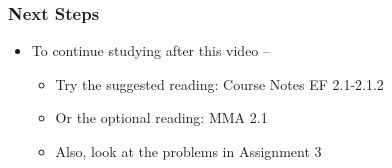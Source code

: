 \documentclass[10pt,english,aspectratio=169]{beamer}
\begin{document}
\begin{frame} \frametitle{Next Steps}

\begin{itemize}
\setlength\itemsep{5mm}
\item To continue studying after this video -- \vspace{2mm}

\begin{itemize}
 \setlength\itemsep{3mm}
 \item Try the suggested reading: Course Notes EF 2.1-2.1.2
 \item Or the optional reading: MMA 2.1
 \item Also, look at the problems in Assignment 3
\end{itemize}
\end{itemize}


\end{frame}
\end{document}
